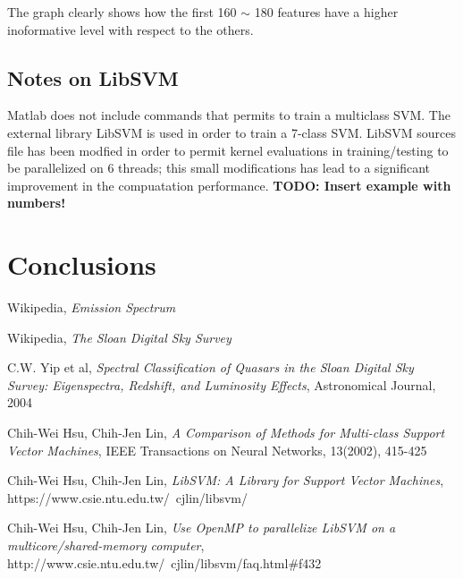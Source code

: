 \documentclass[a4paper,10pt]{article}
\begin{document}
      \noindent The graph clearly shows how the first 160 $\sim$ 180 features have a higher inoformative level with respect to the others.\newline
      

  \subsection{Notes on LibSVM}
    Matlab does not include commands that permits to train a multiclass SVM. The external library LibSVM \cite{libsvm} is used in order
    to train a 7-class SVM. LibSVM sources file has been modfied \cite{openmpsvm} in order to permit kernel evaluations in training/testing
    to be parallelized on 6 threads; this small modifications has lead to a significant improvement in the compuatation performance.\newline
    \textbf{TODO: Insert example with numbers!}
    
\newpage

\section{Conclusions}

\newpage

\begin{thebibliography}{9}
    Wikipedia,
    \emph{Emission Spectrum}
    
    Wikipedia,
    \emph{The Sloan Digital Sky Survey}
    
    C.W. Yip et al,
    \emph{Spectral Classification of Quasars in the Sloan Digital Sky Survey: Eigenspectra, Redshift, and Luminosity Effects},
    Astronomical Journal,
    2004
    
    Chih-Wei Hsu, Chih-Jen Lin,
    \emph{A Comparison of Methods for Multi-class Support Vector Machines},
    IEEE Transactions on Neural Networks, 13(2002), 415-425
    
    Chih-Wei Hsu, Chih-Jen Lin,
    \emph{LibSVM: A Library for Support Vector Machines},
    https://www.csie.ntu.edu.tw/~cjlin/libsvm/
    
    Chih-Wei Hsu, Chih-Jen Lin,
    \emph{Use OpenMP to parallelize LibSVM on a multicore/shared-memory computer},
    http://www.csie.ntu.edu.tw/~cjlin/libsvm/faq.html\#f432
\end{thebibliography}
\end{document}
